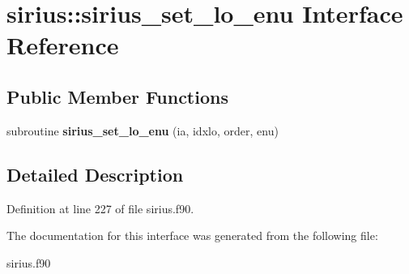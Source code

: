 \hypertarget{interfacesirius_1_1sirius__set__lo__enu}{}\section{sirius\+:\+:sirius\+\_\+set\+\_\+lo\+\_\+enu Interface Reference}
\label{interfacesirius_1_1sirius__set__lo__enu}
\subsection*{Public Member Functions}
\begin{DoxyCompactItemize}
\item 
\hypertarget{interfacesirius_1_1sirius__set__lo__enu_a15c1e8c382fbe6e6c031012a36f4f5c9}{}subroutine {\bfseries sirius\+\_\+set\+\_\+lo\+\_\+enu} (ia, idxlo, order, enu)\label{interfacesirius_1_1sirius__set__lo__enu_a15c1e8c382fbe6e6c031012a36f4f5c9}

\end{DoxyCompactItemize}


\subsection{Detailed Description}


Definition at line 227 of file sirius.\+f90.



The documentation for this interface was generated from the following file\+:\begin{DoxyCompactItemize}
\item 
sirius.\+f90\end{DoxyCompactItemize}
